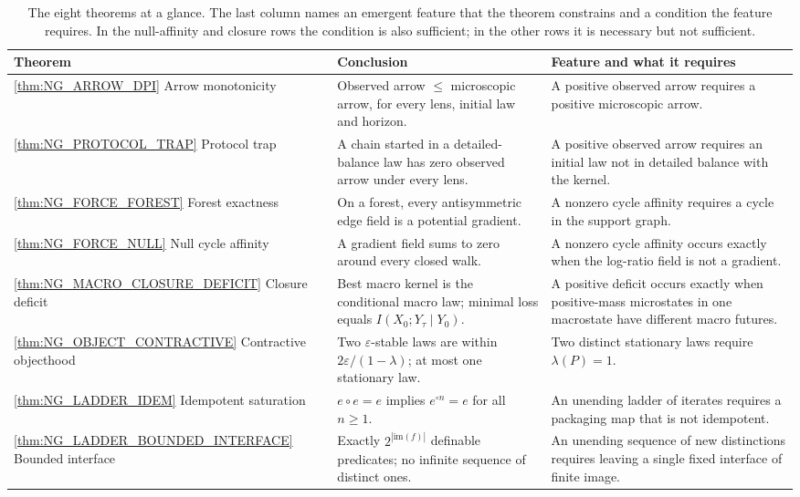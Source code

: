 \documentclass[11pt]{article}
\theoremstyle{definition}
\newcommand{\im}{\mathrm{im}}
\newcommand{\1}{\mathbf{1}}
\begin{document}
\begin{table}[t]
\centering
\small
\caption{The eight theorems at a glance. The last column names an emergent feature that the theorem constrains and a condition the feature requires. In the null-affinity and closure rows the condition is also sufficient; in the other rows it is necessary but not sufficient.}\label{tab:overview}
\renewcommand{\arraystretch}{1.15}
\begin{tabularx}{\textwidth}{@{}>{\raggedright\arraybackslash}p{}>{\raggedright\arraybackslash}X>{\raggedright\arraybackslash}p{}@{}}
\toprule
Theorem & Conclusion & Feature and what it requires \\
\midrule
\ref{thm:NG_ARROW_DPI} Arrow monotonicity & Observed arrow $\le$ microscopic arrow, for every lens, initial law and horizon. & A positive observed arrow requires a positive microscopic arrow. \\
\ref{thm:NG_PROTOCOL_TRAP} Protocol trap & A chain started in a detailed-balance law has zero observed arrow under every lens. & A positive observed arrow requires an initial law not in detailed balance with the kernel. \\
\ref{thm:NG_FORCE_FOREST} Forest exactness & On a forest, every antisymmetric edge field is a potential gradient. & A nonzero cycle affinity requires a cycle in the support graph. \\
\ref{thm:NG_FORCE_NULL} Null cycle affinity & A gradient field sums to zero around every closed walk. & A nonzero cycle affinity occurs exactly when the log-ratio field is not a gradient. \\
\ref{thm:NG_MACRO_CLOSURE_DEFICIT} Closure deficit & Best macro kernel is the conditional macro law; minimal loss equals $I(X_0;Y_\tau\mid Y_0)$. & A positive deficit occurs exactly when positive-mass microstates in one macrostate have different macro futures. \\
\ref{thm:NG_OBJECT_CONTRACTIVE} Contractive objecthood & Two $\varepsilon$-stable laws are within $2\varepsilon/(1-\lambda)$; at most one stationary law. & Two distinct stationary laws require $\lambda(P)=1$. \\
\ref{thm:NG_LADDER_IDEM} Idempotent saturation & $e\circ e=e$ implies $e^{\circ n}=e$ for all $n\ge 1$. & An unending ladder of iterates requires a packaging map that is not idempotent. \\
\ref{thm:NG_LADDER_BOUNDED_INTERFACE} Bounded interface & Exactly $2^{|\im(f)|}$ definable predicates; no infinite sequence of distinct ones. & An unending sequence of new distinctions requires leaving a single fixed interface of finite image. \\
\bottomrule
\end{tabularx}
\end{table}
\end{document}
